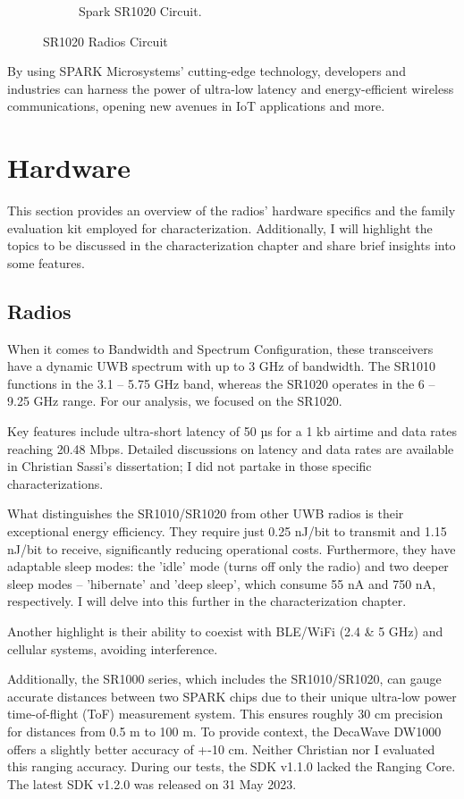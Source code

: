 \begin{figure}
\begin{subfigure}[b]{.7\textwidth}
        \caption{Spark SR1020 Circuit.}
        \label{fig:radio_circuit}
    \end{subfigure}
    \caption{SR1020 Radios Circuit}
    \label{fig:sr1020_radios}
\end{figure}


By using SPARK Microsystems' cutting-edge technology, developers and industries can harness the power of ultra-low latency and energy-efficient wireless communications, opening new avenues in IoT applications and more.

\section{Hardware}
\label{sec:spark_hardware}
This section provides an overview of the radios' hardware specifics and the family evaluation kit employed for characterization. Additionally, I will highlight the topics to be discussed in the characterization chapter and share brief insights into some features.


\subsection{Radios}
When it comes to Bandwidth and Spectrum Configuration, these transceivers have a dynamic UWB spectrum with up to 3 GHz of bandwidth. The SR1010 functions in the 3.1 – 5.75 GHz band, whereas the SR1020 operates in the 6 – 9.25 GHz range. For our analysis, we focused on the SR1020.

Key features include ultra-short latency of 50 µs for a 1 kb airtime and data rates reaching 20.48 Mbps. Detailed discussions on latency and data rates are available in Christian Sassi’s dissertation; I did not partake in those specific characterizations.

What distinguishes the SR1010/SR1020 from other UWB radios is their exceptional energy efficiency. They require just 0.25 nJ/bit to transmit and 1.15 nJ/bit to receive, significantly reducing operational costs. Furthermore, they have adaptable sleep modes: the 'idle' mode (turns off only the radio) and two deeper sleep modes – 'hibernate' and 'deep sleep', which consume 55 nA and 750 nA, respectively. I will delve into this further in the characterization chapter.

Another highlight is their ability to coexist with BLE/WiFi (2.4 \& 5 GHz) and cellular systems, avoiding interference.

Additionally, the SR1000 series, which includes the SR1010/SR1020, can gauge accurate distances between two SPARK chips due to their unique ultra-low power time-of-flight (ToF) measurement system. This ensures roughly 30 cm precision for distances from 0.5 m to 100 m. To provide context, the DecaWave DW1000 offers a slightly better accuracy of +-10 cm\cite{DW1000_manual}. Neither Christian nor I evaluated this ranging accuracy. During our tests, the SDK v1.1.0 lacked the Ranging Core. The latest SDK v1.2.0 was released on 31 May 2023.



